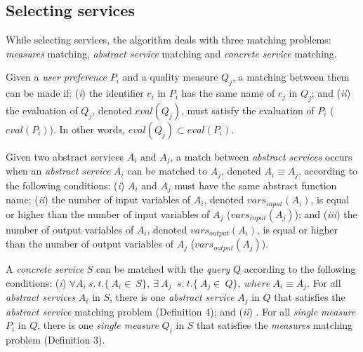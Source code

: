 \subsection{Selecting services}

While selecting services, the algorithm deals with three matching problems: \textit{measures} matching, \textit{abstract service} matching and \textit{concrete service} matching.

\begin{defi}
Given a \textit{user preference} $P_{i}$ and a quality measure $Q_{j}$, a matching between them can be made if:
(\textit{i}) the identifier $c_{i}$ in $P_{i}$ has the same name of $c_{j}$ in $Q_{j}$; and
(\textit{ii}) the evaluation of $Q_{j}$, denoted $eval(Q_{j})$, must satisfy the evaluation of $P_{i}$ ($eval(P_{i})$). In other words, $eval(Q_{j}) \subset eval(P_{i})$.
\end{defi}

\begin{defi}
Given two abstract services $A_{i}$ and $A_{j}$, a match between \textit{abstract services} occurs when an \textit{abstract service} $A_{i}$ can be matched to $A_{j}$, denoted $A_{i} \equiv A_{j}$, according to the following conditions: 
(\textit{i}) $A_{i}$ and $A_{j}$ must have the same abstract function name; 
(\textit{ii}) the number of input variables of $A_{i}$, denoted $vars_{input}(A_{i})$, is equal or higher than the number of input variables of $A_{j}$ ($vars_{input}(A_{j})$); and 
(\textit{iii}) the number of output variables of $A_{i}$, denoted $vars_{output}(A_{i})$, is equal or higher than the number of output variables of $A_{j}$ ($vars_{output}(A_{j})$).
\end{defi}

\begin{defi}
A \textit{concrete service} $S$ can be matched with the \textit{query} $Q$ according to the following conditions:
(\textit{i}) $\forall A_{i}  \ s. \ t. \lbrace\ A_{i} \in \ S\rbrace, \ \exists \ A_{j} \ $ $s. \ t. \lbrace\ A_{j} \in \ Q\rbrace, \ where \ A_{i} \equiv A_{j}.$ For all \textit{abstract services} $A_{i}$ in $S$, there is one \textit{abstract service} $A_{j}$ in $Q$ that satisfies the \textit{abstract service} matching problem (Definition 4); and
(\textit{ii}) . For all \textit{single measure} $P_{i}$ in $Q$, there is one \textit{single measure} $Q_{i}$ in $S$ that satisfies the \textit{measures} matching problem (Definition 3).
\end{defi}


